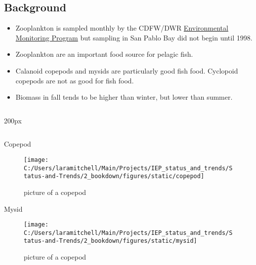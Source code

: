 \documentclass[
]{book}
\providecommand{\tightlist}{%
  \setlength{\itemsep}{0pt}\setlength{\parskip}{0pt}}
\begin{document}
\begin{columns-nocenter}

\begin{column}{0.7\textwidth}
\begin{column}

\hypertarget{background-3}{%
\subsection{Background}\label{background-3}}

\begin{itemize}
\tightlist
\item
  Zooplankton is sampled monthly by the CDFW/DWR \href{https://emp.baydeltalive.com/wiki/12297}{Environmental Monitoring Program} but sampling in San Pablo Bay did not begin until 1998.
\item
  Zooplankton are an important food source for pelagic fish.
\item
  Calanoid copepods and mysids are particularly good fish food. Cyclopoid copepods are not as good for fish food.
\item
  Biomass in fall tends to be higher than winter, but lower than summer.
\end{itemize}

\end{column}
\end{column}

\begin{column}{200px\textwidth}
\begin{column}

Copepod

\begin{figure}

{\centering \texttt{[image: C:/Users/laramitchell/Main/Projects/IEP\_status\_and\_trends/Status-and-Trends/2\_bookdown/figures/static/copepod]} 

}

\caption{picture of a copepod}\label{fig:unnamed-chunk-112}
\end{figure}

Mysid

\begin{figure}

{\centering \texttt{[image: C:/Users/laramitchell/Main/Projects/IEP\_status\_and\_trends/Status-and-Trends/2\_bookdown/figures/static/mysid]} 

}

\caption{picture of a copepod}\label{fig:unnamed-chunk-113}
\end{figure}

\end{column}
\end{column}

\end{columns-nocenter}
\end{document}
